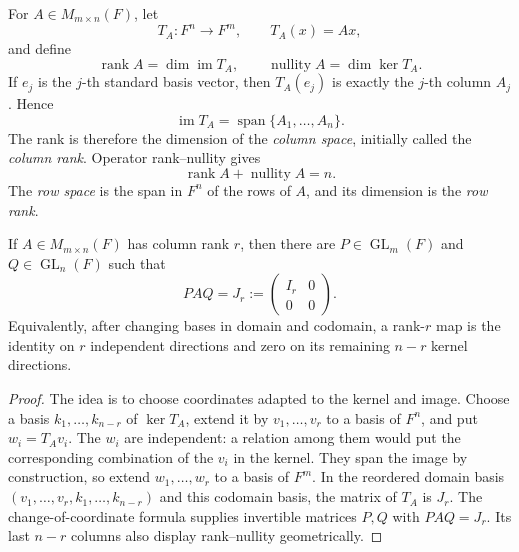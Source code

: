 For \(A\in M_{m\times n}(F)\), let
\[
T_A:F^n\longrightarrow F^m,\qquad T_A(x)=Ax,
\]
and define
\[
\operatorname{rank}A=\dim\operatorname{im}T_A,
\qquad
\operatorname{nullity}A=\dim\ker T_A.
\]
If \(e_j\) is the \(j\)-th standard basis vector, then \(T_A(e_j)\) is
exactly the \(j\)-th column \(A_j\).  Hence
\[
\operatorname{im}T_A=\operatorname{span}\{A_1,\ldots,A_n\}.
\]
The rank is therefore the dimension of the \emph{column space}, initially
called the \emph{column rank}.  Operator rank--nullity gives
\begin{equation}\label{eq:matrix-rank-nullity}
\operatorname{rank}A+\operatorname{nullity}A=n.
\end{equation}
The \emph{row space} is the span in \(F^n\) of the rows of \(A\), and its
dimension is the \emph{row rank}.

\begin{theorem}\label{thm:rank-normal-form}
If \(A\in M_{m\times n}(F)\) has column rank \(r\), then there are
\(P\in\operatorname{GL}_m(F)\) and \(Q\in\operatorname{GL}_n(F)\) such that
\[
PAQ=J_r:=
\begin{pmatrix}I_r&0\\0&0\end{pmatrix}.
\]
Equivalently, after changing bases in domain and codomain, a rank-\(r\) map is
the identity on \(r\) independent directions and zero on its remaining
\(n-r\) kernel directions.
\end{theorem}
\begin{proof}
The idea is to choose coordinates adapted to the kernel and image.  Choose a
basis \(k_1,\ldots,k_{n-r}\) of \(\ker T_A\), extend it by
\(v_1,\ldots,v_r\) to a basis of \(F^n\), and put \(w_i=T_Av_i\).
The \(w_i\) are independent: a relation among them would put the corresponding
combination of the \(v_i\) in the kernel.  They span the image by construction,
so extend \(w_1,\ldots,w_r\) to a basis of \(F^m\).  In the reordered domain
basis
\((v_1,\ldots,v_r,k_1,\ldots,k_{n-r})\) and this codomain basis, the matrix of
\(T_A\) is \(J_r\).  The change-of-coordinate formula supplies invertible
matrices \(P,Q\) with \(PAQ=J_r\).  Its last \(n-r\) columns also display
rank--nullity geometrically.
\end{proof}

